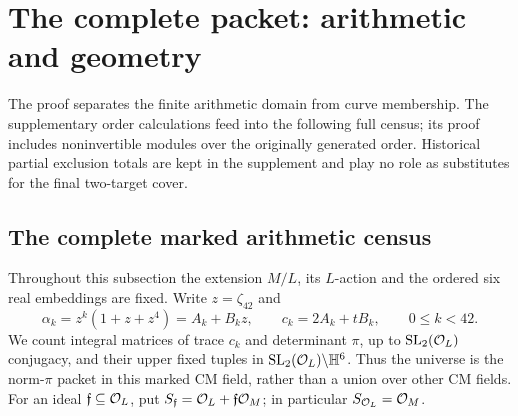 \section{The complete packet: arithmetic and geometry}
The proof separates the finite arithmetic domain from curve membership.
The supplementary order calculations feed into the following full census;
its proof includes noninvertible modules over the originally generated order.
Historical partial exclusion totals are kept in the supplement and play no
role as substitutes for the final two-target cover.

\subsection{The complete marked arithmetic census}\label{subsec:arithmeticcensus}

Throughout this subsection the extension $M/L$, its $L$-action and the
ordered six real embeddings are fixed.  Write $z=\zeta_{42}$ and
\[
 \alpha_k=z^k(1+z+z^4)=A_k+B_kz,\qquad
 c_k=2A_k+tB_k,\qquad 0\leq k<42.
\]
We count integral matrices of trace $c_k$ and determinant $\pi$, up to
$\operatorname{SL}_2(\mathcal O_L)$ conjugacy, and their upper fixed tuples in
$\operatorname{SL}_2(\mathcal O_L)\backslash\mathbb H^6$.  Thus the universe is the norm-$\pi$ packet
in this marked CM field, rather than a union over other CM fields.
For an ideal $\mathfrak f\subseteq\mathcal O_L$, put
$S_{\mathfrak f}=\mathcal O_L+\mathfrak f\mathcal O_M$; in particular
$S_{\mathcal O_L}=\mathcal O_M$.


